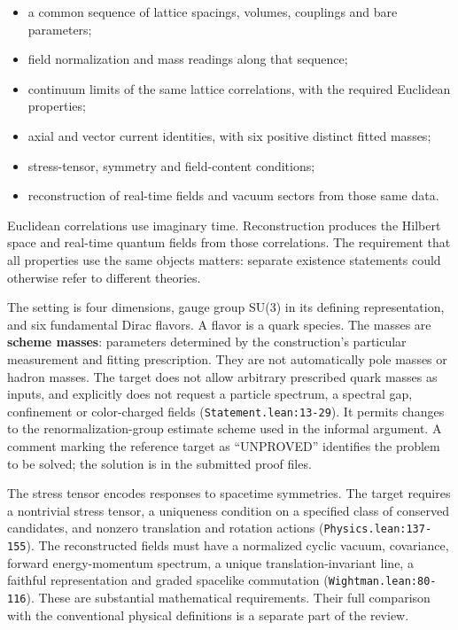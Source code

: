 \documentclass[
  11pt,
]{article}
\providecommand{\tightlist}{%
  \setlength{\itemsep}{0pt}\setlength{\parskip}{0pt}}
\begin{document}
\begin{itemize}
\tightlist
\item
  a common sequence of lattice spacings, volumes, couplings and bare
  parameters;
\item
  field normalization and mass readings along that sequence;
\item
  continuum limits of the same lattice correlations, with the required
  Euclidean properties;
\item
  axial and vector current identities, with six positive distinct fitted
  masses;
\item
  stress-tensor, symmetry and field-content conditions;
\item
  reconstruction of real-time fields and vacuum sectors from those same
  data.
\end{itemize}

Euclidean correlations use imaginary time. Reconstruction produces the
Hilbert space and real-time quantum fields from those correlations. The
requirement that all properties use the same objects matters: separate
existence statements could otherwise refer to different theories.

The setting is four dimensions, gauge group SU(3) in its defining
representation, and six fundamental Dirac flavors. A flavor is a quark
species. The masses are \textbf{scheme masses}: parameters determined by
the construction's particular measurement and fitting prescription. They
are not automatically pole masses or hadron masses. The target does not
allow arbitrary prescribed quark masses as inputs, and explicitly does
not request a particle spectrum, a spectral gap, confinement or
color-charged fields ({\small \nolinkurl{Statement.lean:13-29}}). It
permits changes to the renormalization-group estimate scheme used in the
informal argument. A comment marking the reference target as
``UNPROVED'' identifies the problem to be solved; the solution is in the
submitted proof files.

The stress tensor encodes responses to spacetime symmetries. The target
requires a nontrivial stress tensor, a uniqueness condition on a
specified class of conserved candidates, and nonzero translation and
rotation actions ({\small \nolinkurl{Physics.lean:137-155}}). The
reconstructed fields must have a normalized cyclic vacuum, covariance,
forward energy-momentum spectrum, a unique translation-invariant line, a
faithful representation and graded spacelike commutation
({\small \nolinkurl{Wightman.lean:80-116}}). These are substantial
mathematical requirements. Their full comparison with the conventional
physical definitions is a separate part of the review.
\end{document}
